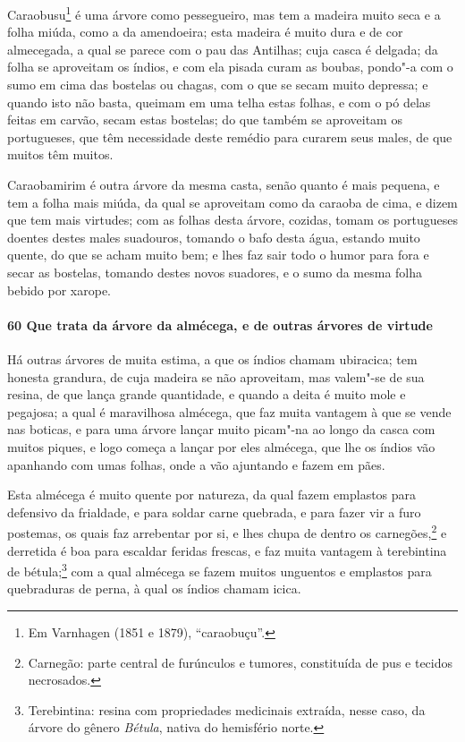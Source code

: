 \begin{linenumbers}
Caraobusu\footnote{ Em Varnhagen (1851 e 1879), ``caraobuçu''.} é uma árvore como
pessegueiro, mas tem a madeira muito seca e a folha miúda, como a da amendoeira; esta
madeira é muito dura e de cor almecegada, a qual se parece com o pau das Antilhas; cuja
casca é delgada; da folha se aproveitam os índios, e com ela pisada curam as boubas,
pondo"-a com o sumo em cima das bostelas ou chagas, com o que se secam muito depressa; e
quando isto não basta, queimam em uma telha estas folhas, e com o pó delas feitas em
carvão, secam estas bostelas; do que também se aproveitam os portugueses, que têm
necessidade deste remédio para curarem seus males, de que muitos têm muitos.

Caraobamirim é outra árvore da mesma casta, senão quanto é mais pequena, e tem a folha
mais miúda, da qual se aproveitam como da caraoba de cima, e dizem que tem mais virtudes;
com as folhas desta árvore, cozidas, tomam os portugueses doentes destes males suadouros,
tomando o bafo desta água, estando muito quente, do que se acham muito bem; e lhes faz
sair todo o humor para fora e secar as bostelas, tomando destes novos suadores, e o sumo
da mesma folha bebido por xarope.

\paragraph{60 Que trata da árvore da almécega, e de outras árvores de virtude}\quad
Há outras árvores de muita estima, a que os índios chamam ubiracica; tem honesta grandura,
de cuja madeira se não aproveitam, mas valem"-se de sua resina, de que lança grande
quantidade, e quando a deita é muito mole e pegajosa; a qual é maravilhosa almécega, que
faz muita vantagem à que se vende nas boticas, e para uma árvore lançar muito picam"-na ao
longo da casca com muitos piques, e logo começa a lançar por eles almécega, que lhe os
índios vão apanhando com umas folhas, onde a vão ajuntando e fazem em pães.

Esta almécega é muito quente por natureza, da qual fazem emplastos para defensivo da
frialdade, e para soldar carne quebrada, e para fazer vir a furo postemas, os quais faz
arrebentar por si, e lhes chupa de dentro os carnegões,\footnote{ Carnegão: parte central
de furúnculos e tumores, constituída de pus e tecidos necrosados.} e derretida é boa para
escaldar feridas frescas, e faz muita vantagem à terebintina de bétula;\footnote{
Terebintina: resina com propriedades medicinais extraída, nesse caso, da árvore do gênero
\textit{Bétula}, nativa do hemisfério norte.} com a qual almécega se fazem muitos
unguentos e emplastos para quebraduras de perna, à qual os índios chamam icica.


\end{linenumbers}
